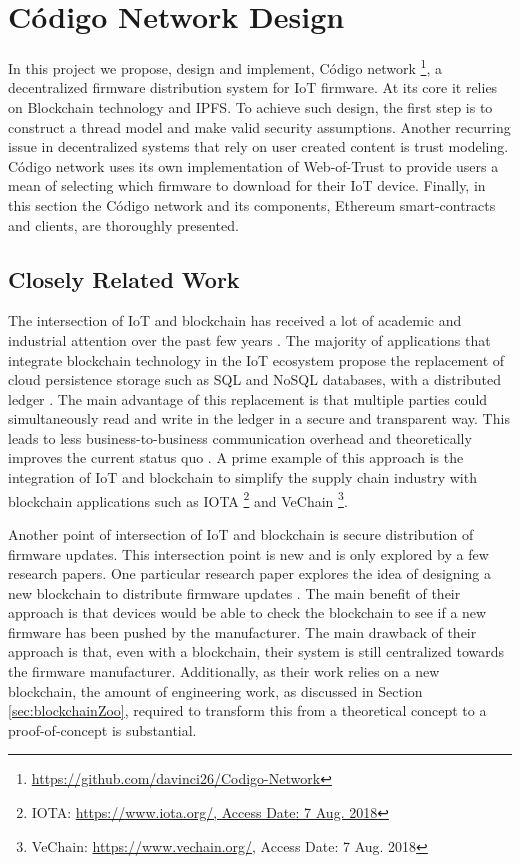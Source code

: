 
\chapter{Código Network Design}\label{chap:CNDesign}{

In this project we propose, design and implement, Código network \footnote{\url{https://github.com/davinci26/Codigo-Network}}, a decentralized firmware distribution system for IoT firmware. At its core it relies on Blockchain technology and IPFS. To achieve such design, the first step is to construct a thread model and make valid security assumptions. Another recurring issue in decentralized systems that rely on user created content is trust modeling. Código network uses its own implementation of Web-of-Trust to provide users a mean of selecting which firmware to download for their IoT device. Finally, in this section the Código network and its components, Ethereum smart-contracts and clients, are thoroughly presented.

\section{Closely Related Work}{

The intersection of IoT and blockchain has received a lot of academic and industrial attention over the past few years \cite{Christidis2016BlockchainsThings}. The majority of applications that integrate blockchain technology in the IoT ecosystem propose the replacement of cloud persistence storage such as SQL and NoSQL databases, with a distributed ledger \cite{HUCKLE2016461}. The main advantage of this replacement is that multiple parties could simultaneously read and write in the ledger in a secure and transparent way. This leads to less business-to-business communication overhead and theoretically improves the current status quo \cite{KouzIoTBC}. A prime example of this approach is the integration of IoT and blockchain to simplify the supply chain industry with blockchain applications such as IOTA \footnote{IOTA: \url{https://www.iota.org/, Access Date: 7 Aug. 2018}} and VeChain \footnote{VeChain: \url{https://www.vechain.org/}, Access Date: 7 Aug. 2018}.

Another point of intersection of IoT and blockchain is secure distribution of firmware updates. This intersection point is new and is only explored by a few research papers. One particular research paper explores the idea of designing a new blockchain to distribute firmware updates \cite{Lee2017Blockchain}. The main benefit of their approach is that devices would be able to check the blockchain to see if a new firmware has been pushed by the manufacturer. The main drawback of their approach is that, even with a blockchain, their system is still centralized towards the firmware manufacturer. Additionally, as their work relies on a new blockchain, the amount of engineering work, as discussed in Section \ref{sec:blockchainZoo}, required to transform this from a theoretical concept to a proof-of-concept is substantial.

}}
